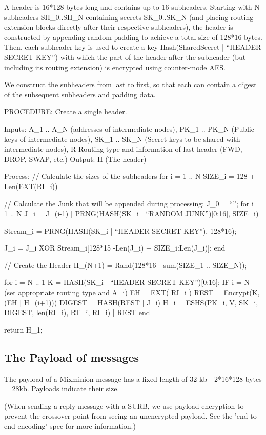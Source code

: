 A header is 16*128 bytes long and contains up to 16
subheaders. Starting with N subheaders SH_0..SH_N containing secrets
SK_0..SK_N (and placing routing extension blocks directly after their
respective subheaders), the header is constructed by appending 
random padding to achieve a total size
of 128*16 bytes. Then, each subheader key is used to create a key
Hash(SharedSecret | ``HEADER SECRET KEY'') with which the part of the
header after the subheader (but including its routing extension) is
encrypted using counter-mode AES.

We construct the subheaders from last to first, so that each can contain
a digest of the subsequent subheaders and padding data.

PROCEDURE: Create a single header.

Inputs: A_1 .. A_N (addresses of intermediate nodes), 
	PK_1 .. PK_N (Public keys of intermediate nodes),
	SK_1 .. SK_N (Secret keys to be shared with intermediate nodes),
        R Routing type and information of last header (FWD, DROP, SWAP, etc.)
Output: H (The header)

Process: 
  // Calculate the sizes of the subheaders
  for i = 1 .. N
	SIZE_i = 128 + Len(EXT(RI_i))

  // Calculate the Junk that will be appended during processing:
  J_0 = ``'';
  for i = 1 .. N
	J_i = J_(i-1) | PRNG(HASH(SK_i | ``RANDOM JUNK'')[0:16], SIZE_i)

        Stream_i = PRNG(HASH(SK_i | ``HEADER SECRET KEY''), 128*16);

	J_i = J_i XOR Stream_i[128*15 -Len(J_i) + SIZE_i:Len(J_i)];
  end

  // Create the Header
  H_(N+1) = Rand(128*16 - sum(SIZE_1 .. SIZE_N));

  for i = N .. 1
	K = HASH(SK_i | ``HEADER SECRET KEY'')[0:16];
	IF i = N (set appropriate routing type and A_i)
	EH = EXT( RI_i )
        REST = Encrypt(K, (EH | H_(i+1)))
  	DIGEST = HASH(REST | J_i)
	H_i = ESHS(PK_i, V, SK_i, DIGEST, len(RI_i), RT_i, RI_i) | REST
  end

return H_1;

\subsection{The Payload of messages}

The payload of a Mixminion message has a fixed length of 32 kb
- 2*16*128 bytes = 28kb.   Payloads indicate their size.

(When sending a reply message with a SURB, we use payload encryption
to prevent the crossover point from seeing an unencrypted payload. See
the 'end-to-end encoding' spec for more information.)

